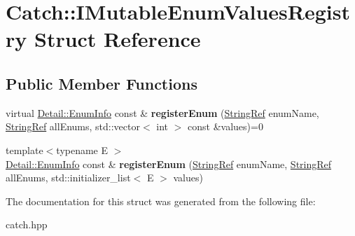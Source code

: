 \hypertarget{structCatch_1_1IMutableEnumValuesRegistry}{}\section{Catch\+:\+:I\+Mutable\+Enum\+Values\+Registry Struct Reference}
\label{structCatch_1_1IMutableEnumValuesRegistry}
\subsection*{Public Member Functions}
\begin{DoxyCompactItemize}
\item 
\mbox{\label{structCatch_1_1IMutableEnumValuesRegistry_a948e66e85f5b66ab68256d50bfe548f4}} 
virtual \hyperlink{structCatch_1_1Detail_1_1EnumInfo}{Detail\+::\+Enum\+Info} const  \& {\bfseries register\+Enum} (\hyperlink{classCatch_1_1StringRef}{String\+Ref} enum\+Name, \hyperlink{classCatch_1_1StringRef}{String\+Ref} all\+Enums, std\+::vector$<$ int $>$ const \&values)=0
\item 
\mbox{\label{structCatch_1_1IMutableEnumValuesRegistry_a60e4546c6fd45f9be68e43410403b562}} 
{\footnotesize template$<$typename E $>$ }\\\hyperlink{structCatch_1_1Detail_1_1EnumInfo}{Detail\+::\+Enum\+Info} const  \& {\bfseries register\+Enum} (\hyperlink{classCatch_1_1StringRef}{String\+Ref} enum\+Name, \hyperlink{classCatch_1_1StringRef}{String\+Ref} all\+Enums, std\+::initializer\+\_\+list$<$ E $>$ values)
\end{DoxyCompactItemize}


The documentation for this struct was generated from the following file\+:\begin{DoxyCompactItemize}
\item 
catch.\+hpp\end{DoxyCompactItemize}

